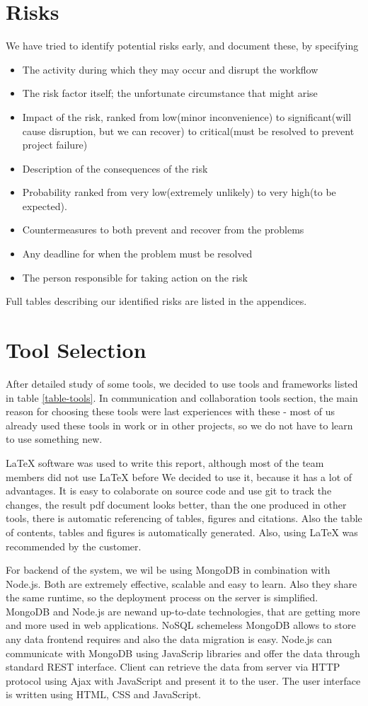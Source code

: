 \section{Risks}
We have tried to identify potential risks early, and document these, by specifying
\begin{itemize}
\item The activity during which they may occur and disrupt the workflow
\item The risk factor itself; the unfortunate circumstance that might arise
\item Impact of the risk, ranked from low(minor inconvenience) to significant(will cause disruption, but we can recover) to critical(must be resolved to prevent project failure)
\item Description of the consequences of the risk
\item Probability ranked from very low(extremely unlikely) to very high(to be expected).
\item Countermeasures to both prevent and recover from the problems
\item Any deadline for when the problem must be resolved
\item The person responsible for taking action on the risk
\end{itemize}
Full tables describing our identified risks are listed in the appendices.


\section{Tool Selection}
After detailed study of some tools, we decided to use tools and frameworks listed in table \ref{table-tools}. In communication and collaboration tools section, the main reason for choosing these tools were last experiences with these - most of us already used these tools in work or in other projects, so we do not have to learn to use something new. 

LaTeX software was used to write this report, although most of the team members did not use LaTeX before We decided to use it, because it has a lot of advantages. It is easy to colaborate on source code and use git to track the changes, the result pdf document looks better, than the one produced in other tools, there is automatic referencing of tables, figures and citations. Also the table of contents, tables and figures is automatically generated. Also, using LaTeX was recommended by the customer.

For backend of the system, we wil be using MongoDB in combination with Node.js. Both are extremely effective, scalable and easy to learn. Also they share the same runtime, so the deployment process on the server is simplified. MongoDB and Node.js are newand up-to-date technologies, that are getting more and more used in web applications. NoSQL schemeless MongoDB allows to store any data frontend requires and also the data migration is easy. Node.js can communicate with MongoDB using JavaScrip libraries and offer the data through standard REST interface. Client can retrieve the data from server via HTTP protocol using Ajax with JavaScript and present it to the user. The user interface is written using HTML, CSS and JavaScript.

